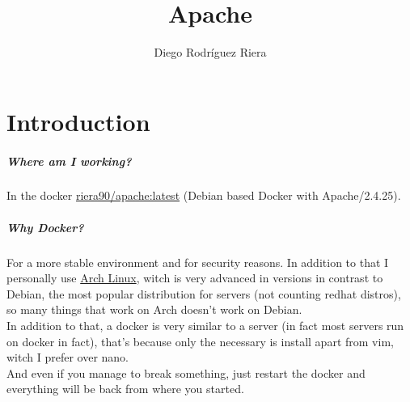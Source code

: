 \documentclass[a4paper,10pt]{article}
\title{Apache}
\author{Diego Rodríguez Riera}
\newcommand\tab[1][1cm]{\hspace*{#1}}
\begin{document}
\maketitle
\pagebreak
\tableofcontents
\pagebreak

\section{Introduction}
\subparagraph{Where am I working?}
In the docker \href{https://hub.docker.com/r/riera90/apache/}{riera90/apache:latest} (Debian based Docker with Apache/2.4.25).
\subparagraph{Why Docker?}
For a more stable environment and for security reasons.
In addition to that I personally use \href{https://www.archlinux.org/}{Arch Linux}, witch is very advanced in versions in contrast to Debian, the most popular distribution for servers (not counting redhat distros), so many things that work on Arch doesn't work on Debian.\vspace{0.5cm}\\\tab
In addition to that, a docker is very similar to a server (in fact most servers run on docker in fact), that's because only the necessary is install apart from vim, witch I prefer over nano.\vspace{0.5cm}\\\tab
And even if you manage to break something, just restart the docker and everything will be back from where you started.
\end{document}
